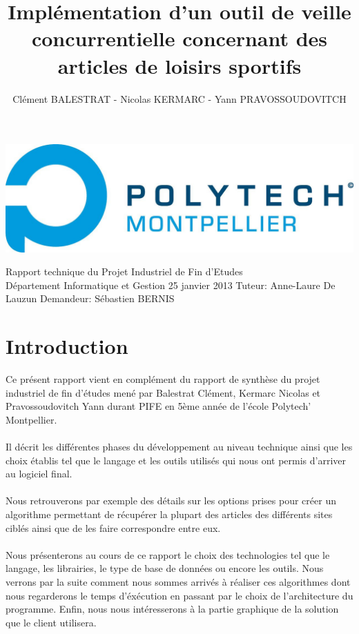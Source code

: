 \documentclass{report}
\title{\LARGE Implémentation d'un outil de veille concurrentielle concernant des articles de loisirs sportifs}      %
\author{Clément BALESTRAT - Nicolas KERMARC - Yann PRAVOSSOUDOVITCH}
\makeatletter
\def\thetitle{\@title}
\def\theauthor{\large\@author}
\makeatother
\begin{document}
\begin{titlepage}

\includegraphics[scale=0.1]{logo.jpg} 

\centering
\vfill
{\Huge\bfseries \thetitle}
\vskip 1cm
{\Large \theauthor}
\hspace{10.5cm}
\vskip 0.25cm
\Large Rapport technique du Projet Industriel de Fin d'Etudes\\
\Large Département Informatique et Gestion
\vskip 0.25cm
\Large 25 janvier 2013
\vskip 0.5cm
\vfill
\large Tuteur: Anne-Laure De Lauzun
\hspace{2cm}
\large Demandeur: Sébastien BERNIS
\end{titlepage}



\renewcommand{\contentsname}{Sommaire}
 


\tableofcontents

\chapter{Introduction}
Ce présent rapport vient en complément du rapport de synthèse du projet industriel de fin d'études mené par Balestrat Clément, Kermarc Nicolas et Pravossoudovitch Yann durant PIFE en 5ème année de l'école Polytech' Montpellier.\\\\
Il décrit les différentes phases du développement au niveau technique ainsi que les choix établis tel que le langage et les outils utilisés qui nous ont permis d'arriver au logiciel final.\\\\
Nous retrouverons par exemple des détails sur les options prises pour créer un algorithme permettant de récupérer la plupart des articles des différents sites ciblés ainsi que de les faire correspondre entre eux.\\\\
Nous présenterons au cours de ce rapport le choix des technologies tel que le langage, les librairies, le type de base de données ou encore les outils. Nous verrons par la suite comment nous sommes arrivés à réaliser ces algorithmes dont nous regarderons le temps d'éxécution en passant par le choix de l'architecture du programme. Enfin, nous nous intéresserons à la partie graphique de la solution que le client utilisera.
\end{document}
